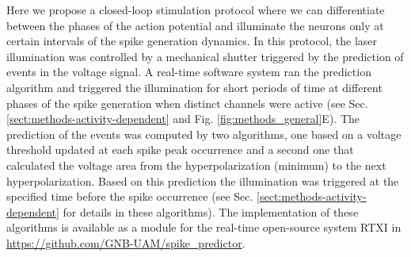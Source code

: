 Here we propose a closed-loop stimulation protocol where we can differentiate between the phases of the action potential and illuminate the neurons only at certain intervals of the spike generation dynamics. In this protocol, the laser illumination was controlled by a mechanical shutter triggered by the prediction of events in the voltage signal. A real-time software system ran the prediction algorithm and triggered the illumination for short periods of time at different phases of the spike generation when distinct channels were active (see Sec. \ref{sect:methods-activity-dependent} and Fig. \ref{fig:methods_general}E). The prediction of the events was computed by two algorithms, one based on a voltage threshold updated at each spike peak occurrence and a second one that calculated the voltage area from the hyperpolarization (minimum) to the next hyperpolarization. Based on this prediction the illumination was triggered at the specified time before the spike occurrence (see Sec. \ref{sect:methods-activity-dependent} for details in these algorithms). The implementation of these algorithms is available as a module for the real-time open-source system RTXI \parencite{patel_hard_2017} in \href{github.com/GNB-UAM/spike_predictor}{https://github.com/GNB-UAM/spike\_predictor}.


